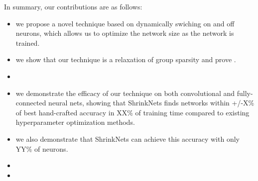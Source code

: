 In summary, our contributions are as follows: 
\begin{itemize}
\item we propose a novel technique based on dynamically swiching on and off neurons, 
which allows us to optimize the network size as the network is trained. 
\item we show that our technique is a relaxation of group sparsity and 
prove . 
\item {}
\item we demonstrate the efficacy of our technique on both convolutional and fully-connected neural nets,
showing that 
ShrinkNets finds networks within +/-X\% of best hand-crafted accuracy in XX\% of
training time compared to existing hyperparameter optimization methods.
\item we also demonstrate that ShrinkNets can achieve this accuracy with only YY\% 
of neurons.
\item {}
\item {}
\end{itemize}